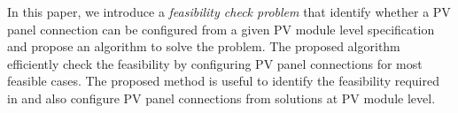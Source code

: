 \documentclass[conference]{IEEEtran}
\begin{document}
In this paper, we introduce a \textit{feasibility check problem} that identify whether a PV panel connection can be configured from a given PV module level specification and propose an algorithm to solve the problem. The proposed algorithm efficiently check the feasibility by configuring PV panel connections for most feasible cases. 
The proposed method is useful to 
identify the feasibility required in \cite{orozco2016optimized} and also 
configure PV panel connections from solutions at PV module level.



\end{document}
